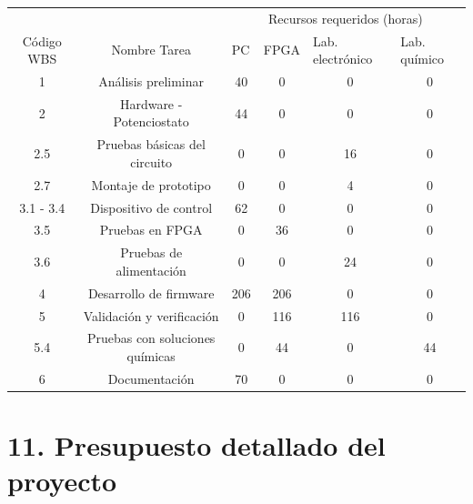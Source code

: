 \documentclass[11pt]{charter}
\begin{document}
\begin{table}[H]
\label{tab:recursos}
\begin{tabular}{|c|c|c|c|c|c|}
\hline
\cellcolor[HTML]{C0C0C0} &
  \cellcolor[HTML]{C0C0C0} &
  \multicolumn{4}{c|}{\cellcolor[HTML]{C0C0C0}Recursos requeridos (horas)} \\ \cline{3-6} 
\multirow{-2}{*}{\cellcolor[HTML]{C0C0C0}Código WBS} &
  \multirow{-2}{*}{\cellcolor[HTML]{C0C0C0}Nombre Tarea} &
  \multicolumn{1}{l|}{PC} &
  \multicolumn{1}{l|}{FPGA} &
  \multicolumn{1}{l|}{Lab. electrónico} &
  \multicolumn{1}{l|}{Lab. químico} \\ \hline
1         & Análisis preliminar             & 40  & 0   & 0   & 0  \\ \hline
2         & Hardware - Potenciostato        & 44  & 0   & 0   & 0  \\ \hline
2.5       & Pruebas básicas del circuito    & 0   & 0   & 16  & 0  \\ \hline
2.7       & Montaje de prototipo            & 0   & 0   & 4   & 0  \\ \hline
3.1 - 3.4 & Dispositivo de control          & 62  & 0   & 0   & 0  \\ \hline
3.5       & Pruebas en FPGA                 & 0   & 36  & 0   & 0  \\ \hline
3.6       & Pruebas de alimentación         & 0   & 0   & 24  & 0  \\ \hline
4         & Desarrollo de firmware          & 206 & 206 & 0   & 0  \\ \hline
5         & Validación y verificación       & 0   & 116 & 116 & 0  \\ \hline
5.4       & Pruebas con soluciones químicas & 0   & 44  & 0   & 44 \\ \hline
6         & Documentación                   & 70  & 0   & 0   & 0  \\ \hline
\end{tabular}
\end{table}


\section{11. Presupuesto detallado del proyecto}
\label{sec:presupuesto}
\end{document}
